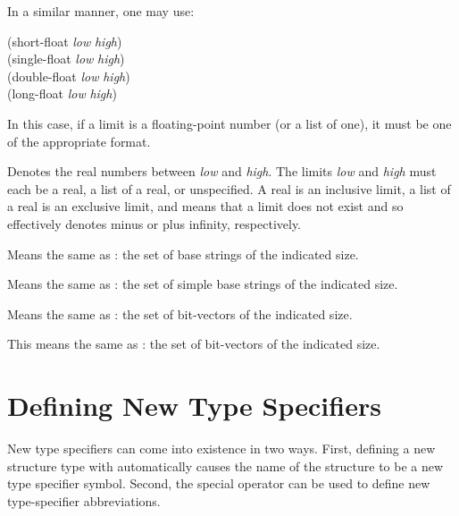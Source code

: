 \begin{flushdesc}
In a similar manner, one may use:
\begin{lisp}
(short-float \emph{low} \emph{high}) \\
(single-float \emph{low} \emph{high}) \\
(double-float \emph{low} \emph{high}) \\
(long-float \emph{low} \emph{high})
\end{lisp}
In this case, if a limit is a floating-point
number (or a list of one), it must be one of the appropriate format.

\item[\cd{(real \emph{low} \emph{high})}]
Denotes the real numbers between
\emph{low} and \emph{high}.  The limits \emph{low} and \emph{high}
must each be a real, a list of a real, or unspecified.
A real is an inclusive limit,
a list of a real is an exclusive limit, and
\cd{*} means that a limit does not exist
and so effectively denotes minus or plus infinity, respectively.

\item[\cd{(base-string \emph{size})}]
Means the same as
: the set of base
strings of the indicated size.

\item[\cd{(simple-base-string \emph{size})}]
Means the same
as : the set of simple base
strings of the indicated size.

\item[\cd{(bit-vector \emph{size})}]
Means the same as :
the set of bit-vectors of the indicated size.

\item[\cd{(simple-bit-vector \emph{size})}]
This means the same as
: the set of bit-vectors of
the indicated size.
\end{flushdesc}

\section{Defining New Type Specifiers}

New type specifiers can come into existence in two ways.
First, defining a new structure type with  automatically
causes the name of the structure to be a new type specifier symbol.
Second, the  special operator can be used to define new type-specifier
abbreviations.

